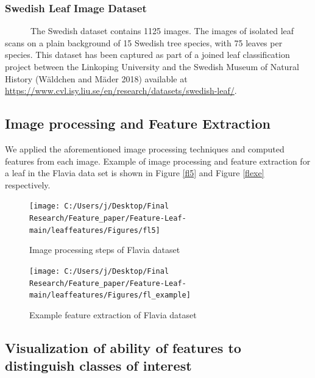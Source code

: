 \documentclass{article}
\begin{document}
\hypertarget{swedish-leaf-image-dataset}{%
\subsubsection{Swedish Leaf Image
Dataset}\label{swedish-leaf-image-dataset}}

~~~~~~The Swedish dataset contains 1125 images. The images of isolated
leaf scans on a plain background of 15 Swedish tree species, with 75
leaves per species. This dataset has been captured as part of a joined
leaf classification project between the Linkoping University and the
Swedish Museum of Natural History (Wäldchen and Mäder 2018) available at
\url{https://www.cvl.isy.liu.se/en/research/datasets/swedish-leaf/}.

\hypertarget{image-processing-and-feature-extraction}{%
\subsection{Image processing and Feature
Extraction}\label{image-processing-and-feature-extraction}}

We applied the aforementioned image processing techniques and computed
features from each image. Example of image processing and feature
extraction for a leaf in the Flavia data set is shown in Figure
\ref{fl5} and Figure \ref{flexe} respectively.

\begin{figure}[!ht]

{\centering \texttt{[image: C:/Users/j/Desktop/Final Research/Feature\_paper/Feature-Leaf-main/leaffeatures/Figures/fl5]} 

}

\caption{\label{fl5}Image processing steps of Flavia dataset}\label{fig:unnamed-chunk-37}
\end{figure}

\begin{figure}[!ht]

{\centering \texttt{[image: C:/Users/j/Desktop/Final Research/Feature\_paper/Feature-Leaf-main/leaffeatures/Figures/fl\_example]} 

}

\caption{\label{flexe}Example feature extraction of Flavia dataset}\label{fig:unnamed-chunk-38}
\end{figure}

\hypertarget{visualization-of-ability-of-features-to-distinguish-classes-of-interest}{%
\subsection{Visualization of ability of features to distinguish classes
of
interest}\label{visualization-of-ability-of-features-to-distinguish-classes-of-interest}}
\end{document}
